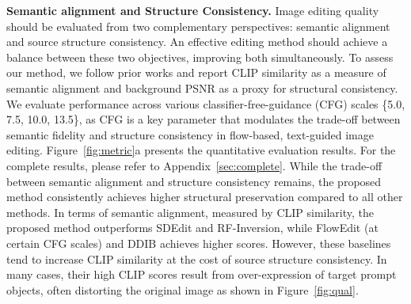 \noindent\textbf{Semantic alignment and Structure Consistency.}
Image editing quality should be evaluated from two complementary perspectives: semantic alignment and source structure consistency.
An effective editing method should achieve a balance between these two objectives, improving both simultaneously.
To assess our method, we follow prior works and report CLIP similarity as a measure of semantic alignment and background PSNR as a proxy for structural consistency. We evaluate performance across various classifier-free-guidance (CFG) scales \{5.0, 7.5, 10.0, 13.5\}, as CFG is a key parameter that modulates the trade-off between semantic fidelity and structure consistency in flow-based, text-guided image editing.
Figure~\ref{fig:metric}a presents the quantitative evaluation results. For the complete results, please refer to Appendix~\ref{sec:complete}.
While the trade-off between semantic alignment and structure consistency remains, the proposed method consistently achieves higher structural preservation compared to all other methods.
In terms of semantic alignment, measured by CLIP similarity, the proposed method outperforms SDEdit and RF-Inversion, while FlowEdit (at certain CFG scales) and DDIB achieves higher scores.
However, these baselines tend to increase CLIP similarity at the cost of source structure consistency. In many cases, their high CLIP scores result from over-expression of target prompt objects, often distorting the original image as shown in Figure~\ref{fig:qual}.

    \begin{table}[!hbt]
    \centering
    \caption{Quantitative comparison for backward editing results. \textbf{Bold} represents the best.}
    \label{tab:recon_metric}
     \vspace{-0.3cm}
\end{table}

